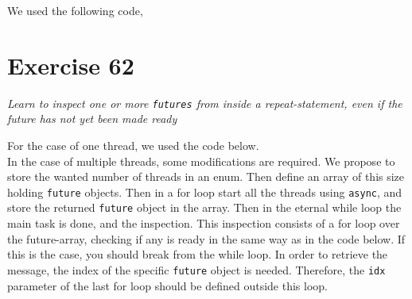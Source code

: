 \documentclass[12pt]{article}
\newcommand{\desc}[1]{\textit{#1} \vspace{1em}}
\begin{document}
We used the following code,



\clearpage

\section*{Exercise 62}
\desc{Learn to inspect one or more \texttt{futures} from inside a repeat-statement, even if the future has not yet been made ready}

For the case of one thread, we used the code below. \\
In the case of multiple threads, some modifications are required. We propose to store the wanted number of threads in an enum. Then define an array of this size holding \texttt{future} objects. Then in a for loop start all the threads using \texttt{async}, and store the returned \texttt{future} object in the array. Then in the eternal while loop the main task is done, and the inspection. This inspection consists of a for loop over the future-array, checking if any is ready in the same way as in the code below. If this is the case, you should break from the while loop. In order to retrieve the message, the index of the specific \texttt{future} object is needed. Therefore, the \texttt{idx} parameter of the last for loop should be defined outside this loop.   



\clearpage
\end{document}
